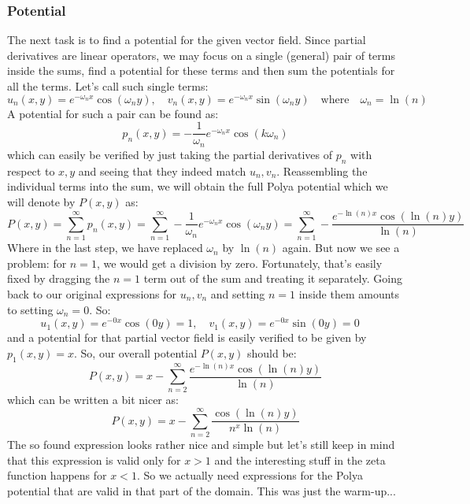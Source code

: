 \documentclass[12pt]{article}
\begin{document}
\subsubsection{Potential}
The next task is to find a potential for the given vector field. Since partial derivatives are linear operators, we may focus on a single (general) pair of terms inside the sums, find a potential for these terms and then sum the potentials for all the terms. Let's call such single terms:
\begin{equation}
u_n(x,y) = e^{-\omega_n x} \cos(\omega_n y), \quad
v_n(x,y) = e^{-\omega_n x} \sin(\omega_n y)  \quad \text{where} \quad
\omega_n = \ln(n)
\end{equation}
A potential for such a pair can be found as:
\begin{equation}
p_n(x,y) = - \frac{1}{\omega_n}  e^{-\omega_n x} \cos(k \omega_n)
\end{equation}
which can easily be verified by just taking the partial derivatives of $p_n$ with respect to $x,y$ and seeing that they indeed match $u_n, v_n$. Reassembling the individual terms into the sum, we will obtain the full Polya potential which we will denote by $P(x,y)$ as:
\begin{equation}
P(x,y)	
= \sum_{n=1}^{\infty} p_n(x,y) 
= \sum_{n=1}^{\infty}  - \frac{1}{\omega_n}  e^{-\omega_n x} \cos(\omega_n y)
= \sum_{n=1}^{\infty}  - \frac{e^{-\ln(n) x} \cos(\ln(n) y)}{\ln(n)}  
\end{equation}
Where in the last step, we have replaced $\omega_n$ by $\ln(n)$ again. But now we see a problem: for $n=1$, we would get a division by zero. Fortunately, that's easily fixed by dragging the $n=1$ term out of the sum and treating it separately. Going back to our original expressions for $u_n, v_n$ and setting $n=1$ inside them amounts to setting $\omega_n=0$. So:
\begin{equation}
u_1(x,y) = e^{-0 x} \cos(0 y) = 1, \quad
v_1(x,y) = e^{-0 x} \sin(0 y) = 0  \quad
\end{equation}
and a potential for that partial vector field is easily verified to be given by $p_1(x,y) = x$. So, our overall potential $P(x,y)$ should be:
\begin{equation}
P(x,y) = x - \sum_{n=2}^{\infty} \frac{e^{-\ln(n) x} \cos(\ln(n) y)}{\ln(n)}  
\end{equation}
which can be written a bit nicer as:
\begin{equation}
\label{Eq:PolyaPotentialOriginal}		
\boxed{ P(x,y) = x - \sum_{n=2}^{\infty} \frac{\cos(\ln(n) y)}{n^x \ln(n)}  }
\end{equation}
The so found expression looks rather nice and simple but let's still keep in mind that this expression is valid only for $x > 1$ and the interesting stuff in the zeta function happens for $x < 1$. So we actually need expressions for the Polya potential that are valid in that part of the domain. This was just the warm-up...
\end{document}

